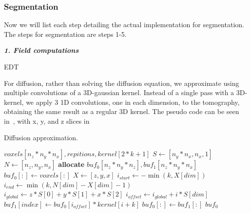 \subsubsection{Segmentation}
Now we will list each step detailing the actual implementation for segmentation. The steps for segmentation are steps 1-5.

\vspace{\baselineskip}
\noindent\textit{\textbf{1. Field computations}}

EDT

For diffusion, rather than solving the diffusion equation, we approximate using multiple convolutions of a 3D-gaussian kernel.
Instead of a single pass with a 3D-kernel, we apply 3 1D convolutions, one in each dimension, to the tomography, obtaining the same result as a regular 3D kernel.
The pseudo code can be seen in~, with x, y, and z slices in~


\begin{algorithm}
    \caption{Diffusion approximation.}
    \label{alg:diffusion}
    \begin{algorithmic}
         {$voxels[n_z*n_y*n_x], repitions, kernel[2*k+1]$}
            \State $S \gets [n_y * n_x, n_x, 1]$
            \State $N \gets [n_z, n_y, n_x]$
            \State \textbf{allocate} $buf_0[n_z*n_y*n_z], buf_1[n_z*n_y*n_x]$
            \State $buf_0[:] \gets voxels[:]$
                        \State $X \gets [z,y,x]$
                        \State $i_{start} \gets - \min (k, X[dim])$
                        \State $i_{end} \gets \min (k, N[dim] - X[dim] - 1)$
                        \State $i_{global} \gets z*S[0] + y*S[1] + x*S[2]$
                            \State $i_{offset} \gets i_{global} + i*S[dim]$
                            \State $buf_1[index] \gets buf_0[i_{offset}] * kernel[i+k]$
                        \EndFor
                    \EndFor
                    \State $buf_0[:] \gets buf_1[:]$
                \EndFor
            \EndFor
            \Return $buf_0$
        \EndFunction
    \end{algorithmic}
\end{algorithm}

